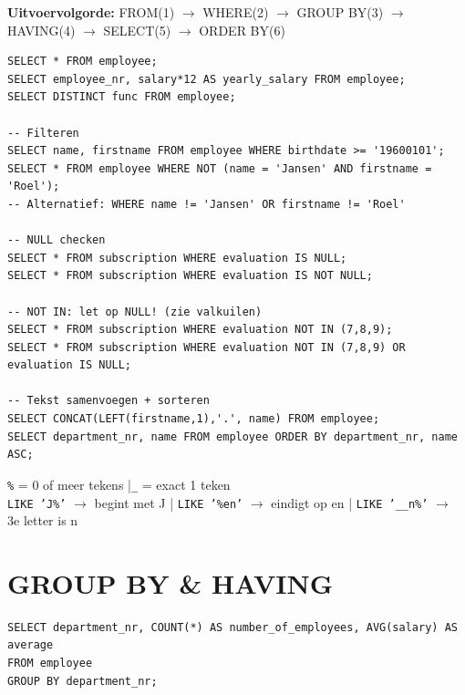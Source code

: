 \documentclass[10pt,a4paper]{article}
\begin{document}
\textbf{Uitvoervolgorde:} FROM(1) $\to$ WHERE(2) $\to$ GROUP BY(3) $\to$ HAVING(4) $\to$ SELECT(5) $\to$ ORDER BY(6)

\begin{tcolorbox}[sqlbox,title=Basisvoorbeelden]
\begin{lstlisting}
SELECT * FROM employee;
SELECT employee_nr, salary*12 AS yearly_salary FROM employee;
SELECT DISTINCT func FROM employee;

-- Filteren
SELECT name, firstname FROM employee WHERE birthdate >= '19600101';
SELECT * FROM employee WHERE NOT (name = 'Jansen' AND firstname = 'Roel');
-- Alternatief: WHERE name != 'Jansen' OR firstname != 'Roel'

-- NULL checken
SELECT * FROM subscription WHERE evaluation IS NULL;
SELECT * FROM subscription WHERE evaluation IS NOT NULL;

-- NOT IN: let op NULL! (zie valkuilen)
SELECT * FROM subscription WHERE evaluation NOT IN (7,8,9);
SELECT * FROM subscription WHERE evaluation NOT IN (7,8,9) OR evaluation IS NULL;

-- Tekst samenvoegen + sorteren
SELECT CONCAT(LEFT(firstname,1),'.', name) FROM employee;
SELECT department_nr, name FROM employee ORDER BY department_nr, name ASC;
\end{lstlisting}
\end{tcolorbox}

\begin{tcolorbox}[notebox,title=Wildcards bij LIKE]
\texttt{\%} = 0 of meer tekens \quad|\quad \texttt{\_} = exact 1 teken\\
\texttt{LIKE 'J\%'} $\to$ begint met J \quad|\quad
\texttt{LIKE '\%en'} $\to$ eindigt op en \quad|\quad
\texttt{LIKE '\_\_n\%'} $\to$ 3e letter is n
\end{tcolorbox}

\section{GROUP BY \& HAVING}

\begin{tcolorbox}[sqlbox,title=Voorbeeld 1: count + avg per department]
\begin{lstlisting}
SELECT department_nr, COUNT(*) AS number_of_employees, AVG(salary) AS average
FROM employee
GROUP BY department_nr;
\end{lstlisting}
\end{tcolorbox}
\end{document}
